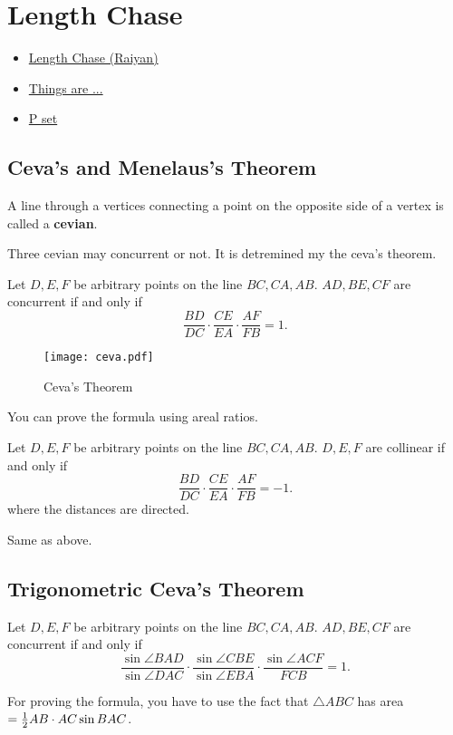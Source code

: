 \chapter{Length Chase}%

\begin{linkb}
   \begin{itemize}
        \item \href{https://www.youtube.com/watch?v=_JJuNoIr_v4}{Length Chase (Raiyan)}
        \item \href{https://drive.google.com/file/d/1SWvcvf99adDs0YVglds3kCpvHxeTdLqP/view}{Things are ...} 
        \item \href{https://drive.google.com/file/d/1MocEDGQHzkW7vjUj6n6HXa_m3iBQRwmG/view}{P set} 
   \end{itemize}
\end{linkb}

\section{Ceva's and Menelaus's Theorem}

A line through a vertices connecting a point on the opposite side of a vertex is called a \textbf{cevian}.

Three cevian may concurrent or not. It is detremined my the ceva's theorem. 
\begin{theorem}
Let $D,E,F$ be arbitrary points on the line $BC,CA,AB$. $AD,BE,CF$ are concurrent if and only if \[\frac{BD}{DC}\cdot \frac{CE}{EA}\cdot \frac{AF}{FB}=1.\]
\end{theorem}
\begin{figure}[ht]
\centering
	\texttt{[image: ceva.pdf]}
	\caption{Ceva's Theorem}
\end{figure}
You can prove the formula using areal ratios.

\begin{theorem}
Let $D,E,F$ be arbitrary points on the line $BC,CA,AB$. $D,E,F$ are collinear if and only if \[\frac{BD}{DC}\cdot \frac{CE}{EA}\cdot \frac{AF}{FB}=-1.\]
where the distances are directed.
\end{theorem}
Same as above.

\section{Trigonometric Ceva's Theorem}
\begin{theorem}
Let $D,E,F$ be arbitrary points on the line $BC,CA,AB$. $AD,BE,CF$ are concurrent if and only if \[\frac{\sin \angle BAD}{\sin \angle DAC}\cdot \frac{\sin \angle CBE}{\sin \angle EBA}\cdot \frac{\sin \angle ACF}{FCB}=1.\]
\end{theorem}
For proving the formula, you have to use the fact that $\triangle ABC$ has area $=\frac{1}{2} AB \cdot AC \sin BAC$.

